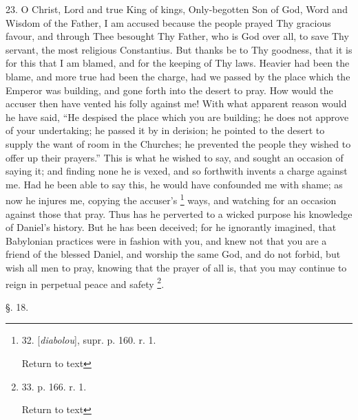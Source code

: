 23. O Christ, Lord and true King of kings, Only-begotten Son of God,
Word and Wisdom of the Father, I am accused because the people prayed
Thy gracious favour, and through Thee besought Thy Father, who is God
over all, to save Thy servant, the most religious Constantius. But
thanks be to Thy goodness, that it is for this that I am blamed, and
for the keeping of Thy laws. Heavier had been the blame, and more true
had been the charge, had we passed by the place which the Emperor was
building, and gone forth into the desert to pray. How would the
accuser then have vented his folly against me! With what apparent
reason would he have said, ``He despised the place which you are
building; he does not approve of your undertaking; he passed it by in
derision; he pointed to the desert to supply the want of room in the
Churches; he prevented the people they wished to offer up their
prayers.'' This is what he wished to say, and sought an occasion of
saying it; and finding none he is vexed, and so forthwith invents a
charge against me. Had he been able to say this, he would have
confounded me with shame; as now he injures me, copying the accuser's
\footnote{32. [\emph{diabolou}], supr. p. 160. r. 1.

Return to text} ways, and watching
for an occasion against those that pray. Thus has he perverted to a
wicked purpose his knowledge of Daniel's history. But he has been
deceived; for he ignorantly imagined, that Babylonian practices were
in fashion with you, and knew not that you are a friend of the blessed
Daniel, and worship the same God, and do not forbid, but wish
all men to pray, knowing that the prayer of all is, that you may
continue to reign in perpetual peace and safety \footnote{33. p. 166. r. 1.

Return to text}.

§. 18.

